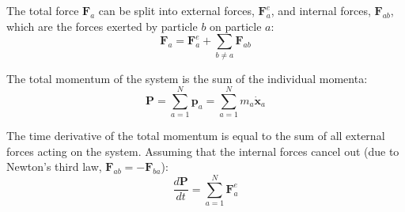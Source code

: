 The total force $\mathbf{F}_a$ can be split into external forces, $\mathbf{F}_a^e$, and internal forces, $\mathbf{F}_{ab}$, which are the forces exerted by particle $b$ on particle $a$:
\begin{equation}
    \mathbf{F}_a = \mathbf{F}_a^e + \sum_{b \neq a} \mathbf{F}_{ab}
\end{equation}

The total momentum of the system is the sum of the individual momenta:
\begin{equation}
    \mathbf{P} = \sum_{a=1}^N \mathbf{p}_a = \sum_{a=1}^N m_a \dot{\mathbf{x}}_a
\end{equation}

The time derivative of the total momentum is equal to the sum of all external forces acting on the system. Assuming that the internal forces cancel out (due to Newton's third law, $\mathbf{F}_{ab} = -\mathbf{F}_{ba}$):
\begin{equation}
    \frac{d\mathbf{P}}{dt} = \sum_{a=1}^N \mathbf{F}_a^e
\end{equation}
